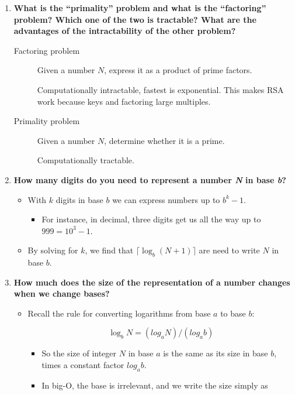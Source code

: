 \documentclass[a4paper,11pt]{article}
\begin{document}
\begin{enumerate}
\def\labelenumi{\arabic{enumi}.}
\item
  \textbf{What is the ``primality'' problem and what is the
  ``factoring'' problem? Which one of the two is tractable? What are the
  advantages of the intractability of the other problem?}

  \begin{description}
  \item[Factoring problem]
  Given a number $N$, express it as a product of prime factors.

  Computationally intractable, fastest is exponential. This makes RSA
  work because keys and factoring large multiples.
  \item[Primality problem]
  Given a number $N$, determine whether it is a prime.

  Computationally tractable.
  \end{description}
\item
  \textbf{How many digits do you need to represent a number \emph{N} in
  base \emph{b}?}

  \begin{itemize}
  \itemsep1pt\parskip0pt
  \item
    With $k$ digits in base $b$ we can express numbers up to $b^k - 1$.

    \begin{itemize}
    \itemsep1pt\parskip0pt
    \item
      For instance, in decimal, three digits get us all the way up to
      $999 = 10^3 - 1$.
    \end{itemize}
  \item
    By solving for $k$, we find that $\lceil \log_b(N + 1) \rceil$ are
    need to write $N$ in base $b$.
  \end{itemize}
\item
  \textbf{How much does the size of the representation of a number
  changes when we change bases?}

  \begin{itemize}
  \item
    Recall the rule for converting logarithms from base $a$ to base $b$:

    \[\log_b N = (log_a N) / (log_a b)\]

    \begin{itemize}
    \item
      So the size of integer $N$ in base $a$ is the same as its size in
      base $b$, times a constant factor $log_a b$.
    \item
      In big-O, the base is irrelevant, and we write the size simply as


\end{itemize}
\end{itemize}
\end{enumerate}
\end{document}
